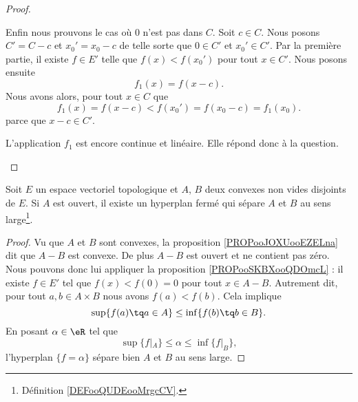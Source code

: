 \begin{proof}
\begin{subproof}
		\spitem[Si \( 0\not\in C\)]
		Enfin nous prouvons le cas où \( 0\) n'est pas dans \( C\). Soit \( c\in C\). Nous posons \( C'=C-c\) et \( x_0'=x_0-c\) de telle sorte que \( 0\in C'\) et \( x_0'\in C'\). Par la première partie, il existe \( f\in E'\) telle que \( f(x)<f(x_0')\) pour tout \( x\in C'\). Nous posons ensuite
		\begin{equation}
			f_1(x)=f(x-c).
		\end{equation}
		Nous avons alors, pour tout \( x\in C\) que
		\begin{equation}
			f_1(x)=f(x-c)<f(x_0')=f(x_0-c)=f_1(x_0).
		\end{equation}
		parce que \( x-c\in C'\).

		L'application \( f_1\) est encore continue et linéaire. Elle répond donc à la question.
	\end{subproof}
\end{proof}


\begin{theorem}  \label{ThoSAJjdZc}
	Soit \( E\) un espace vectoriel topologique et \( A\), \( B\) deux convexes non vides disjoints de \( E\). Si \( A\) est ouvert, il existe un hyperplan fermé qui sépare \( A\) et \( B\) au sens large\footnote{Définition \ref{DEFooQUDEooMrgcCV}.}.
\end{theorem}

\begin{proof}
	Vu que \( A\) et \( B\) sont convexes, la proposition \ref{PROPooJOXUooEZELna} dit que \( A-B\) est convexe. De plus \( A-B\) est ouvert et ne contient pas zéro. Nous pouvons donc lui appliquer la proposition \ref{PROPooSKBXooQDOmcL} : il existe \( f\in E'\) tel que \( f(x)<f(0)=0\) pour tout \( x\in A-B\). Autrement dit, pour tout \( a,b\in A\times B\) nous avons \( f(a)<f(b)\). Cela implique
	\begin{equation}
		\sup\{ f(a)\tq a\in A \}\leq \inf\{ f(b)\tq b\in B \}.
	\end{equation}
	En posant \( \alpha\in \eR\) tel que
	\begin{equation}
		\sup\{ f|_A \}\leq \alpha\leq \inf\{ f|_B \},
	\end{equation}
	l'hyperplan \( \{ f=\alpha \}\) sépare bien \( A\) et \( B\) au sens large.
\end{proof}

